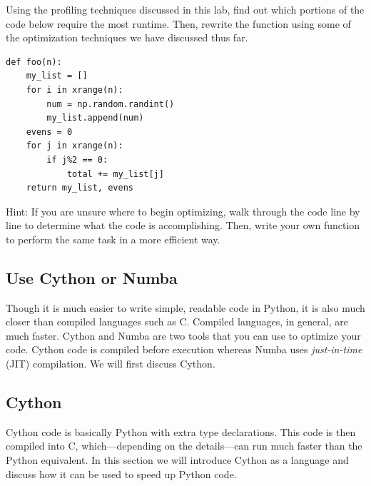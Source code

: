 \begin{problem}
Using the profiling techniques discussed in this lab, find out which portions of the code below require the most runtime. Then, rewrite the function using some of the optimization techniques we have discussed thus far.
\begin{lstlisting}
def foo(n):
    my_list = []
    for i in xrange(n):
        num = np.random.randint()
        my_list.append(num)
    evens = 0
    for j in xrange(n):
        if j%2 == 0:
            total += my_list[j]
    return my_list, evens
\end{lstlisting}

Hint: If you are unsure where to begin optimizing, walk through the code line by line to determine what the code is accomplishing. Then, write your own function to perform the same task in a more efficient way.
\end{problem}


\subsection*{Use Cython or Numba}
Though it is much easier to write simple, readable code in Python, it is also much closer than compiled languages such as C. Compiled languages, in general, are much faster.
Cython and Numba are two tools that you can use to optimize your code. Cython code is compiled before execution whereas Numba uses \emph{just-in-time} (JIT) compilation. We will first discuss Cython.

\subsection*{Cython}
Cython code is basically Python with extra type declarations.
This code is then compiled into C, which---depending on the details---can run much faster than the Python equivalent.
In this section we will introduce Cython as a language and discuss how it can be used to speed up Python code.

